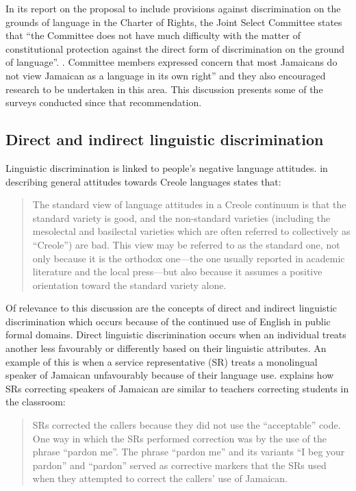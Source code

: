 \documentclass[output=paper,colorlinks,citecolor=brown]{langscibook}
\begin{document}
In its report on the proposal to include provisions against discrimination on the grounds of language in the Charter of Rights, the Joint Select Committee states that “the Committee does not have much difficulty with the matter of constitutional protection against the direct form of discrimination on the ground of language”. \citep[26]{JointSelectCommittee2002}. Committee members expressed concern that most Jamaicans do not view Jamaican as a language in its own right” \citep[5]{Brown-Blake2011} and they also encouraged research to be undertaken in this area. This discussion presents some of the surveys conducted since that recommendation. 


\subsection{Direct and indirect linguistic discrimination}

Linguistic discrimination is linked to people’s negative language attitudes. \citet[2]{Rickford_1983_reprint1985} in describing general attitudes towards Creole languages states that:

\begin{quote}
    The standard view of language attitudes in a Creole continuum is that the standard variety is good, and the non-standard varieties (including the mesolectal and basilectal varieties which are often referred to collectively as “Creole”) are bad. This view may be referred to as the standard one, not only because it is the orthodox one—the one usually reported in academic literature and the local press—but also because it assumes a positive orientation toward the standard variety alone.
\end{quote}

Of relevance to this discussion are the concepts of direct and indirect linguistic discrimination which occurs because of the continued use of English in public formal domains. Direct linguistic discrimination occurs when an individual treats another less favourably or differently based on their linguistic attributes. An example of this is when a service representative (SR) treats a monolingual speaker of Jamaican unfavourably because of their language use. \citet[10]{Walters2017} explains how SRs correcting speakers of Jamaican are similar to teachers correcting students in the classroom:

\begin{quote}
SRs corrected the callers because they did not use the “acceptable” code. One way in which the SRs performed correction was by the use of the phrase “pardon me”. The phrase “pardon me” and its variants “I beg your pardon” and “pardon” served as corrective markers that the SRs used when they attempted to correct the callers’ use of Jamaican.
\end{quote}
    
\end{document}
